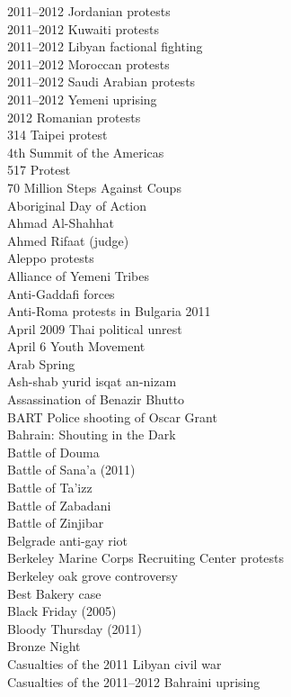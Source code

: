 2011–2012 Jordanian protests\\
2011–2012 Kuwaiti protests\\
2011–2012 Libyan factional fighting\\
2011–2012 Moroccan protests\\
2011–2012 Saudi Arabian protests\\
2011–2012 Yemeni uprising\\
2012 Romanian protests\\
314 Taipei protest\\
4th Summit of the Americas\\
517 Protest\\
70 Million Steps Against Coups\\
Aboriginal Day of Action\\
Ahmad Al-Shahhat\\
Ahmed Rifaat (judge)\\
Aleppo protests\\
Alliance of Yemeni Tribes\\
Anti-Gaddafi forces\\
Anti-Roma protests in Bulgaria 2011\\
April 2009 Thai political unrest\\
April 6 Youth Movement\\
Arab Spring\\
Ash-shab yurid isqat an-nizam\\
Assassination of Benazir Bhutto\\
BART Police shooting of Oscar Grant\\
Bahrain: Shouting in the Dark\\
Battle of Douma\\
Battle of Sana'a (2011)\\
Battle of Ta'izz\\
Battle of Zabadani\\
Battle of Zinjibar\\
Belgrade anti-gay riot\\
Berkeley Marine Corps Recruiting Center protests\\
Berkeley oak grove controversy\\
Best Bakery case\\
Black Friday (2005)\\
Bloody Thursday (2011)\\
Bronze Night\\
Casualties of the 2011 Libyan civil war\\
Casualties of the 2011–2012 Bahraini uprising\\
